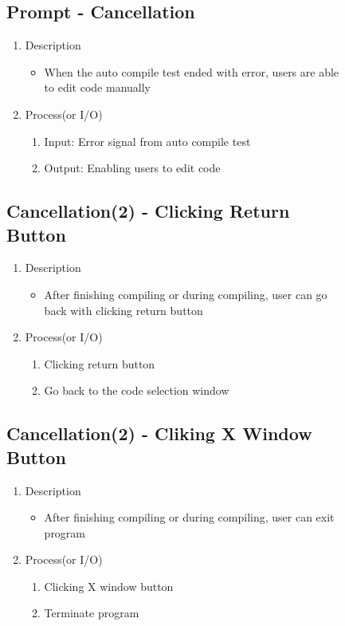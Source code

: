\documentclass[conference]{IEEEtran}
\begin{document}
\begin{itemize}
\begin{itemize}
\begin{itemize}
\begin{itemize}
\begin{figure}[h]
\textit{}

\subsection{Prompt - Cancellation}
\begin{enumerate}
  \item Description
  \begin{itemize}
    \item When the auto compile test ended with error, users are able to edit code manually
  \end{itemize}
  \item Process(or I/O)
  \begin{enumerate}
    \item Input: Error signal from auto compile test
    \item Output: Enabling users to edit code
  \end{enumerate}
\end{enumerate}
\textit{}



\subsection{Cancellation(2) - Clicking Return Button}
\begin{enumerate}
  \item Description
  \begin{itemize}
    \item After finishing compiling or during compiling, user can go back with clicking return button
  \end{itemize}
  \item Process(or I/O)
  \begin{enumerate}
    \item Clicking return button
    \item Go back to the code selection window
  \end{enumerate}
\end{enumerate}
\textit{}


\subsection{Cancellation(2) - Cliking X Window Button}
\begin{enumerate}
  \item Description
  \begin{itemize}
    \item After finishing compiling or during compiling, user can exit program
  \end{itemize}
  \item Process(or I/O)
  \begin{enumerate}
    \item Clicking X window button
    \item Terminate program
  \end{enumerate}
\end{enumerate}
\textit{}



\end{figure}
\end{itemize}
\end{itemize}
\end{itemize}
\end{itemize}
\end{document}
